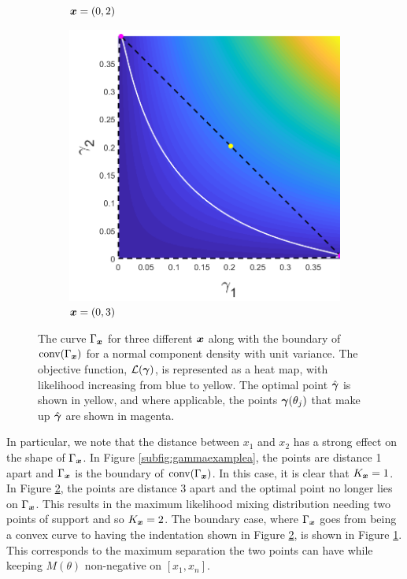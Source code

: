 \begin{figure}[ht]
\begin{subfigure}[t]{0.32\textwidth}
			\caption{${\bm{{x}}} = (0,2)$} \label{subfig:gammaexampleb}
		\end{subfigure}
		\begin{subfigure}[t]{0.32\textwidth}
			\centering
			\includegraphics[width = \textwidth]{Sigma1x1_0-x2_3}
			\caption{${\bm{{x}}} = (0,3)$} \label{subfig:gammaexamplec}
		\end{subfigure}
		\caption[The curve $\Gamma_\vect{x}$ for three different $\vect{x}$ along with the boundary of $\conv(\Gamma_\vect{x})$ for a normal component density with unit variance.]{The curve $\Gamma_\vect{x}$ for three different $\vect{x}$ along with the boundary of $\conv(\Gamma_\vect{x})$ for a normal component density with unit variance. The objective function, $\mathcal{L}({\bm{{\gamma}}})$, is represented as a heat map, with likelihood increasing from blue to yellow. The optimal point $\hat{{\bm{{\gamma}}}}$ is shown in yellow, and where applicable, the points ${\bm{{\gamma}}}(\theta_j)$ that make up $\hat{{\bm{{\gamma}}}}$ are shown in magenta.}
		\label{fig:Gammaexample}
	\end{figure}
%
	In particular, we note that the distance between $x_1$ and $x_2$ has a strong effect on the shape of $\Gamma_\vect{x}$. In Figure \ref{subfig:gammaexamplea}, the points are distance 1 apart and $\Gamma_\vect{x}$ is the boundary of $\conv(\Gamma_\vect{x})$. In this case, it is clear that $K_{\bm{{x}}} = 1$. In Figure \ref{subfig:gammaexamplec}, the points are distance 3 apart and the optimal point no longer lies on $\Gamma_\vect{x}$. This results in the maximum likelihood mixing distribution needing two points of support and so $K_{\bm{{x}}} = 2$. The boundary case, where $\Gamma_\vect{x}$ goes from being a convex curve to having the indentation shown in Figure \ref{subfig:gammaexamplec}, is shown in Figure \ref{subfig:gammaexampleb}. This corresponds to the maximum separation the two points can have while keeping $M(\theta)$ non-negative on $[x_1, x_n]$.


